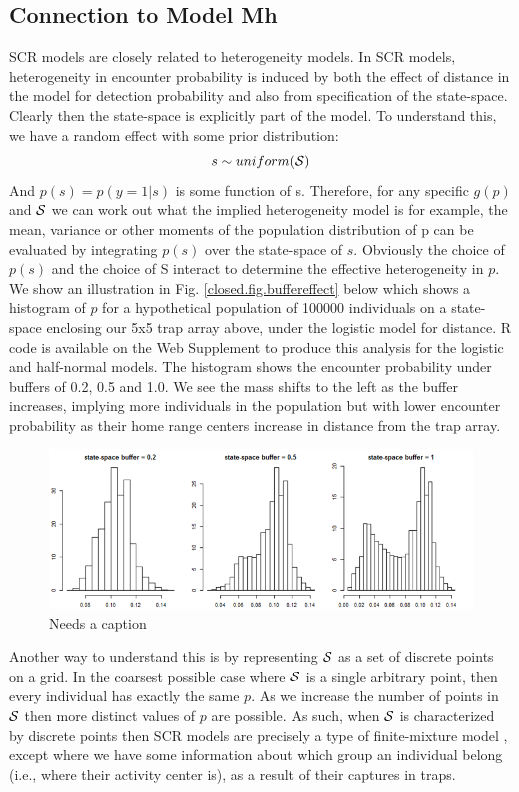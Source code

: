 \subsection{Connection to Model Mh}  \label{sec.scrmh}
SCR models are closely related to heterogeneity models. In SCR models, heterogeneity in encounter probability is induced by both the effect of distance in the model for detection probability and also from specification of the state-space. Clearly then the state-space is explicitly part of the model. To understand this, we have a random effect with some prior distribution:
\[
s \sim uniform({\cal S})
\]
And $p(s) = p(y=1|s)$ is some function of s. Therefore, for any specific $g(p)$ and ${\cal S}$ we can work out what the implied heterogeneity model is for example, the mean, variance or other moments of the population distribution of p can be evaluated by integrating $p(s)$ over the state-space of $s$.  Obviously the choice of $p(s)$ and the choice of {\cal S} interact to determine the effective heterogeneity in $p$. We show an illustration in Fig. \ref{closed.fig.buffereffect} below which shows a histogram of $p$ for a hypothetical population of 100000 individuals on a state-space enclosing our 5x5 trap array above, under the logistic model for distance. R code is available on the Web Supplement to produce this analysis for the logistic and half-normal models. The histogram shows the encounter probability under buffers of 0.2, 0.5 and 1.0. We see the mass shifts to the left as the buffer increases, implying more individuals in the population but with lower encounter probability as their home range centers increase in distance from the trap array. 


\begin{figure}
\begin{center}
\includegraphics[width=5in]{figs/buffereffect}
\end{center}
\caption{Needs a caption}
\label{fig.buffereffect}
\end{figure}

Another way to understand this is by representing ${\cal S}$ as a set
of discrete points on a grid. In the coarsest possible case where
${\cal S}$ is a single arbitrary point, then every individual has
exactly the same $p$. As we increase the number of points in ${\cal
  S}$ then more distinct values of $p$ are possible. As such, when
${\cal S}$ is characterized by discrete points then SCR models are
precisely a type of finite-mixture model \citep{norris_pollock:1996, pledger:2000}, except where we have some information about which group an individual belong (i.e., where their activity center is), as a result of their captures in traps.


